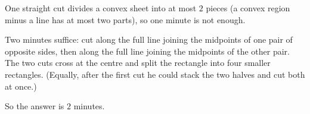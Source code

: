 One straight cut divides a convex sheet into at most $2$ pieces (a convex region minus a line has at most two parts), so one minute is not enough.

Two minutes suffice: cut along the full line joining the midpoints of one pair of opposite sides, then along the full line joining the midpoints of the other pair. The two cuts cross at the centre and split the rectangle into four smaller rectangles. (Equally, after the first cut he could stack the two halves and cut both at once.)

So the answer is $\boxed{2}$ minutes.

